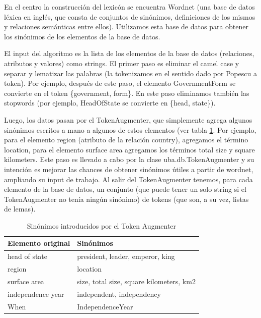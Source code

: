 En el centro la construcción del lexicón se encuentra Wordnet (una base de datos léxica en inglés, que consta de conjuntos de sinónimos, definiciones de los mismos y relaciones semánticas entre ellos). Utilizamos esta base de datos para obtener los sinónimos de los elementos de la base de datos.

El input del algoritmo es la lista de los elementos de la base de datos (relaciones, atributos y valores) como strings. El primer paso es eliminar el camel case y separar y lematizar las palabras (la tokenizamos en el sentido dado por Popescu a token). Por ejemplo, después de este paso, el elemento GovernmentForm se convierte en el token \{government, form\}. En este paso eliminamos también las stopwords (por ejemplo, HeadOfState se convierte en \{head, state\}).

Luego, los datos pasan por el TokenAugmenter, que simplemente agrega algunos sinónimos escritos a mano a algunos de estos elementos (ver tabla \ref{table:token-augmenter}. Por ejemplo, para el elemento region (atributo de la relación country), agregamos el término location, para el elemento surface area agregamos los términos total size y square kilometers. Este paso es llevado a cabo por la clase uba.db.TokenAugmenter y su intención es mejorar las chances de obtener sinónimos útiles a partir de wordnet, ampliando su input de trabajo. Al salir del TokenAugmenter tenemos, para cada elemento de la base de datos, un conjunto (que puede tener un solo string si el TokenAugmenter no tenía ningún sinónimo) de tokens (que son, a su vez, listas de lemas).

\begin{center}
\begin{table}[h]
\centering
\begin{tabular}{| l |  p{12cm} |}
\hline
Elemento original & Sinónimos \\ \hline
head of state & president, leader, emperor, king \\ \hline
region & location\\ \hline
surface area & size, total size, square kilometers, km2\\ \hline
independence year & independent, independency\\ \hline
When & IndependenceYear\\ \hline
\end{tabular}
\caption{Sinónimos introducidos por el Token Augmenter}
\label{table:token-augmenter}
\end{table}
\end{center}

